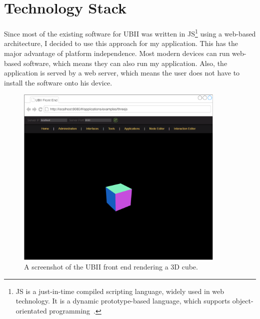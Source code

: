 \section{Technology Stack}\label{section:technology-stack}

Since most of the existing software for \ac{UBII} was written in \acf{JS}\footnote{\ac{JS} is a just-in-time compiled scripting language, widely used in web technology. It is a dynamic prototype-based language, which supports object-orientated programming~\cite[43, 47]{ECMAInternational.2018}.} using a web-based architecture, I decided to use this approach for my application. This has the major advantage of platform independence. Most modern devices can run web-based software, which means they can also run my application. Also, the application is served by a web server, which means the user does not have to install the software onto his device.

\begin{figure}[htpb]
  \centering
  \includegraphics[width=10cm]{figures/implementation/ubii_front_end.pdf}
  \caption[Screenshot of the UBII front end]{A screenshot of the UBII front end rendering a \ac{3D} cube.}\label{fig:ubii-front-end}
\end{figure}

